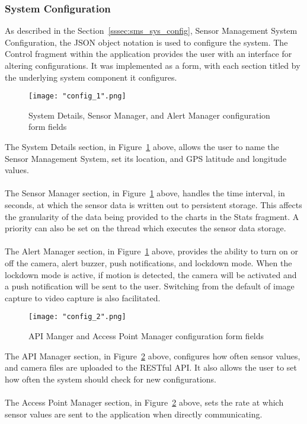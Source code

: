 \documentclass{article}
\begin{document}
\subsubsection{System Configuration}
As described in the Section~\ref{sssec:sms_sys_config}, Sensor Management System Configuration, the JSON object notation is used to configure the system. The Control fragment within the application provides the user with an interface for altering configurations. It was implemented as a form, with each section titled by the underlying system component it configures. 

\begin{figure}[H]
\centering
\texttt{[image: "config\_1".png]}
\caption{System Details, Sensor Manager, and Alert Manager configuration form fields}
\label{fig:android_config_1}
\end{figure}

\noindent
The System Details section, in Figure~\ref{fig:android_config_1} above,  allows the user to name the Sensor Management System, set its location, and GPS latitude and longitude values. \\\\
\noindent
The Sensor Manager section, in Figure~\ref{fig:android_config_1} above, handles the time interval, in seconds, at which the sensor data is written out to persistent storage. This affects the granularity of the data being provided to the charts in the Stats fragment.  A priority can also be set on the thread which executes the sensor data storage. \\\\
The Alert Manager section, in Figure~\ref{fig:android_config_1} above, provides the ability to turn on or off the camera, alert buzzer, push notifications, and lockdown mode. When the lockdown mode is active, if motion is detected, the camera will be activated and a push notification will be sent to the user. Switching from the default of image capture to video capture is also facilitated. 

\begin{figure}[H]
\centering
\texttt{[image: "config\_2".png]}
\caption{API Manger and Access Point Manager configuration form fields}
\label{fig:android_config_2}
\end{figure}

\noindent
The API Manager section, in Figure~\ref{fig:android_config_2} above, configures how often sensor values, and camera files are uploaded to the RESTful API. It also allows the user to set how often the system should check for new configurations.\\\\
The Access Point Manager section, in Figure~\ref{fig:android_config_2} above, sets the rate at which sensor values are sent to the application when directly communicating. \\\\
\end{document}
